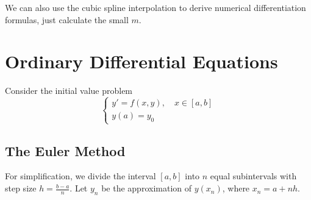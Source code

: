 \documentclass{matharticle}
\begin{document}
\begin{remark}
	We can also use the cubic spline interpolation to derive numerical differentiation formulas, just calculate the small $m$.
\end{remark}

\section{Ordinary Differential Equations}
Consider the initial value problem
\begin{equation}
	\begin{cases}
		y' = f(x, y), \quad x \in [a, b] \\
		y(a) = y_0
	\end{cases}
\end{equation}

\subsection{The Euler Method}
For simplification, we divide the interval $[a, b]$ into $n$ equal subintervals with step size $h = \frac{b - a}{n}$. Let $y_n$ be the approximation of $y(x_n)$, where $x_n = a + n h$.
\end{document}
